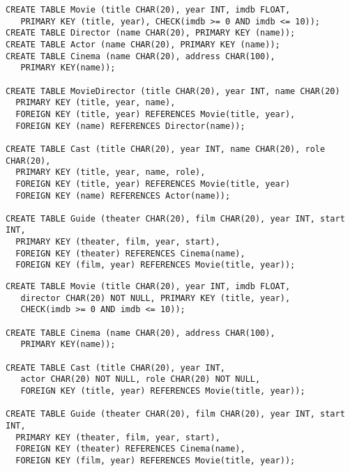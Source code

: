 

\newsavebox\FullMovieSchema
\begin{lrbox}{\FullMovieSchema}\begin{minipage}{\textwidth}
\begin{lstlisting}[style=SQL]
CREATE TABLE Movie (title CHAR(20), year INT, imdb FLOAT,
   PRIMARY KEY (title, year), CHECK(imdb >= 0 AND imdb <= 10));
CREATE TABLE Director (name CHAR(20), PRIMARY KEY (name));
CREATE TABLE Actor (name CHAR(20), PRIMARY KEY (name));
CREATE TABLE Cinema (name CHAR(20), address CHAR(100), 
   PRIMARY KEY(name));

CREATE TABLE MovieDirector (title CHAR(20), year INT, name CHAR(20)
  PRIMARY KEY (title, year, name),
  FOREIGN KEY (title, year) REFERENCES Movie(title, year),
  FOREIGN KEY (name) REFERENCES Director(name));

CREATE TABLE Cast (title CHAR(20), year INT, name CHAR(20), role CHAR(20), 
  PRIMARY KEY (title, year, name, role),
  FOREIGN KEY (title, year) REFERENCES Movie(title, year)
  FOREIGN KEY (name) REFERENCES Actor(name));

CREATE TABLE Guide (theater CHAR(20), film CHAR(20), year INT, start INT, 
  PRIMARY KEY (theater, film, year, start),
  FOREIGN KEY (theater) REFERENCES Cinema(name), 
  FOREIGN KEY (film, year) REFERENCES Movie(title, year));
\end{lstlisting}
\end{minipage}
\end{lrbox}



\newsavebox\SimplifiedMovieSchema
\begin{lrbox}{\SimplifiedMovieSchema}\begin{minipage}{\textwidth}
\begin{lstlisting}[style=SQL]
CREATE TABLE Movie (title CHAR(20), year INT, imdb FLOAT, 
   director CHAR(20) NOT NULL, PRIMARY KEY (title, year), 
   CHECK(imdb >= 0 AND imdb <= 10));

CREATE TABLE Cinema (name CHAR(20), address CHAR(100), 
   PRIMARY KEY(name));

CREATE TABLE Cast (title CHAR(20), year INT, 
   actor CHAR(20) NOT NULL, role CHAR(20) NOT NULL, 
   FOREIGN KEY (title, year) REFERENCES Movie(title, year));

CREATE TABLE Guide (theater CHAR(20), film CHAR(20), year INT, start INT, 
  PRIMARY KEY (theater, film, year, start),
  FOREIGN KEY (theater) REFERENCES Cinema(name), 
  FOREIGN KEY (film, year) REFERENCES Movie(title, year));
\end{lstlisting}
\end{minipage}
\end{lrbox}

